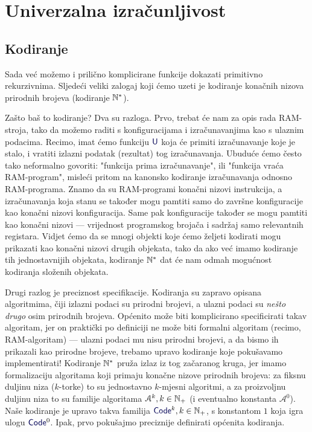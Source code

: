 \chapter{Univerzalna izračunljivost}\label{ch:univ}

\section{Kodiranje}

Sada već možemo i prilično komplicirane funkcije dokazati primitivno rekurzivnima. Sljedeći veliki zalogaj koji ćemo uzeti je kodiranje konačnih nizova prirodnih brojeva (kodiranje ${\mathbb N}^*$).

Zašto baš to kodiranje? Dva su razloga. Prvo, trebat će nam za opis rada RAM-stroja, tako da možemo raditi s konfiguracijama i izračunavanjima kao s ulaznim podacima. Recimo, imat ćemo funkciju $\f U$ koja će primiti izračunavanje koje je stalo, i vratiti izlazni podatak (rezultat) tog izračunavanja. Ubuduće ćemo često tako neformalno govoriti: "funkcija prima izračunavanje", ili "funkcija vraća RAM-program", misleći  pritom na kanonsko kodiranje izračunavanja odnosno RAM-programa. Znamo da su RAM-programi konačni nizovi instrukcija, a izračunavanja koja stanu se također mogu pamtiti samo do završne konfiguracije kao konačni nizovi konfiguracija. Same pak konfiguracije također se mogu pamtiti kao konačni nizovi --- vrijednost programskog brojača i sadržaj samo relevantnih registara. Vidjet ćemo da se mnogi objekti koje ćemo željeti kodirati mogu prikazati kao konačni nizovi drugih objekata, tako da ako već imamo kodiranje tih jednostavnijih objekata, kodiranje ${\mathbb N}^*$ dat će nam odmah mogućnost kodiranja složenih objekata.

Drugi razlog je preciznost specifikacije. Kodiranja su zapravo opisana algoritmima, čiji izlazni podaci su prirodni brojevi, a ulazni podaci su \emph{nešto drugo} osim prirodnih brojeva. Općenito može biti komplicirano specificirati takav algoritam, jer on praktički po definiciji ne može biti formalni algoritam (recimo, RAM-algoritam) --- ulazni podaci mu nisu prirodni brojevi, a da bismo ih prikazali kao prirodne brojeve, trebamo upravo kodiranje koje pokušavamo implementirati! Kodiranje ${\mathbb N}^*$ pruža izlaz iz tog začaranog kruga, jer imamo formalizaciju algoritama koji primaju konačne nizove prirodnih brojeva: za fiksnu duljinu niza ($k$-torke) to su jednostavno $k$-mjesni algoritmi, a za proizvoljnu duljinu niza to su familije algoritama $\mathcal A^k,k\in{\mathbb N}_+$ (i eventualno konstanta $\mathcal A^0$). Naše kodiranje je upravo takva familija $\f{Code}^k,k\in\N_+$, s konstantom $1$ koja igra ulogu $\f{Code}^0$. Ipak, prvo pokušajmo preciznije definirati općenita kodiranja.

